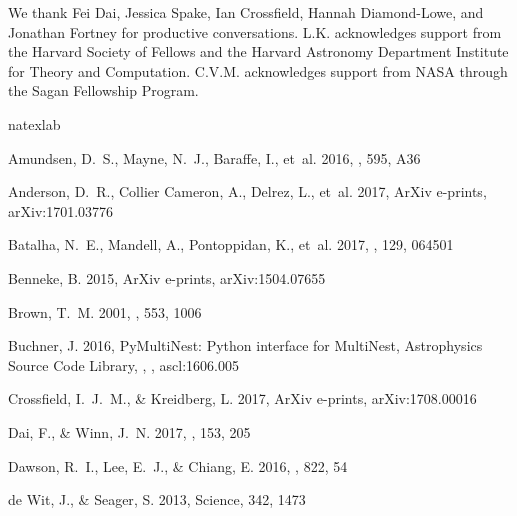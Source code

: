 \documentclass[twocolumn, trackchanges]{aastex61}
\begin{document}
\acknowledgments
We thank Fei Dai, Jessica Spake, Ian Crossfield, Hannah Diamond-Lowe, and Jonathan Fortney for productive conversations. L.K. acknowledges support from the Harvard Society of Fellows and the Harvard Astronomy Department Institute for Theory and Computation. C.V.M. acknowledges support from NASA through the Sagan Fellowship Program.


\begin{thebibliography}{}
\expandafter\ifx\csname natexlab\endcsname\relax\def\natexlab#1{#1}\fi
\providecommand{\url}[1]{\href{#1}{#1}}

{Amundsen}, D.~S., {Mayne}, N.~J., {Baraffe}, I., {et~al.} 2016, \aap, 595, A36

{Anderson}, D.~R., {Collier Cameron}, A., {Delrez}, L., {et~al.} 2017, ArXiv
  e-prints, arXiv:1701.03776

{Batalha}, N.~E., {Mandell}, A., {Pontoppidan}, K., {et~al.} 2017, \pasp, 129,
  064501

{Benneke}, B. 2015, ArXiv e-prints, arXiv:1504.07655

{Brown}, T.~M. 2001, \apj, 553, 1006

{Buchner}, J. 2016, {PyMultiNest: Python interface for MultiNest}, Astrophysics
  Source Code Library, , , ascl:1606.005

{Crossfield}, I.~J.~M., \& {Kreidberg}, L. 2017, ArXiv e-prints,
  arXiv:1708.00016

{Dai}, F., \& {Winn}, J.~N. 2017, \aj, 153, 205

{Dawson}, R.~I., {Lee}, E.~J., \& {Chiang}, E. 2016, \apj, 822, 54

{de Wit}, J., \& {Seager}, S. 2013, Science, 342, 1473


\end{thebibliography}
\end{document}
